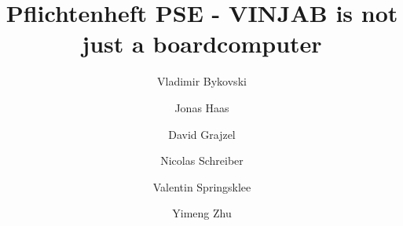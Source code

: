 \documentclass[a4paper]{scrreprt}
\begin{document}
\title{Pflichtenheft PSE - VINJAB is not just a boardcomputer}
\author{Vladimir Bykovski 
			\and Jonas Haas 
			\and David Grajzel 
			\and Nicolas Schreiber
			\and Valentin Springsklee
			\and Yimeng Zhu}




\maketitle

\newpage
\setcounter{page}{1} %


\tableofcontents

\newpage
{}
















\end{document}
